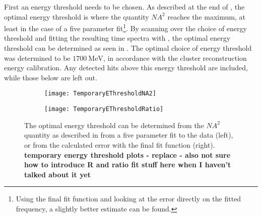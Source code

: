 
First an energy threshold needs to be chosen. As described at the end of , the optimal energy threshold is where the quantity $NA^{2}$ reaches the maximum, at least in the case of a five parameter fit\footnote{Using the final fit function and looking at the error directly on the fitted \wa frequency, a slightly better estimate can be found.}. By scanning over the choice of energy threshold and fitting the resulting time spectra with , the optimal energy threshold can be determined as seen in . The optimal choice of energy threshold was determined to be $\SI{1700}{\MeV}$, in accordance with the cluster reconstruction energy calibration. Any detected hits above this energy threshold are included, while those below are left out.

    \begin{figure}[]
    \centering
        \begin{subfigure}[t]{0.45\textwidth}
            \centering
            \texttt{[image: TemporaryEThresholdNA2]}
            \caption{}
        \end{subfigure}
        \begin{subfigure}[t]{0.45\textwidth}
            \centering
            \texttt{[image: TemporaryEThresholdRatio]}
            \caption{}
        \end{subfigure}%
    \caption[Determination of optimal energy threshold]{The optimal energy threshold can be determined from the $NA^{2}$ quantity as described in  from a five parameter fit to the data (left), or from the calculated error with the final fit function (right). \textbf{temporary energy threshold plots - replace - also not sure how to introduce R and ratio fit stuff here when I haven't talked about it yet}}
    \label{fig:OptimalEnergyThreshold}
    \end{figure}




